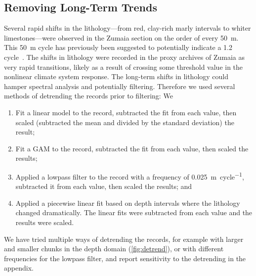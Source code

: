 \documentclass[draft]{agujournal2019}
\newcommand{\rez}{\textcolor{magenta}}
\newcommand{\ijk}{\textcolor{blue}}
\begin{document}
\subsection{Removing Long-Term Trends}\label{sec:detrend}

Several rapid shifts in the lithology---from red, clay-rich marly intervals to whiter limestones---were observed in the Zumaia section on the order of every \qty{50}{\metre}.
This \qty{50}{\metre} cycle has previously been suggested to potentially indicate a \qty{1.2}{\millionyear} cycle~\cite{Batenburg2014}.
The shifts in lithology were recorded in the proxy archives of Zumaia as very rapid transitions, likely as a result of crossing some threshold value in the nonlinear climate system response.
The long-term shifts in lithology could hamper spectral analysis and potentially filtering.
Therefore we used several methods of detrending the records prior to filtering: We
\begin{enumerate}
    \item Fit a linear model to the record, subtracted the fit from each value, then scaled (subtracted the mean and divided by the standard deviation) the result;
    \item Fit a \gls{GAM} to the record, subtracted the fit from each value, then scaled the results;
    \item Applied a lowpass filter to the record with a frequency of \qty{0.025}{\metre\per cycle}, subtracted it from each value, then scaled the results;
and
    \item Applied a piecewise linear fit based on depth intervals where the lithology changed dramatically.
    The linear fits were subtracted from each value and the results were scaled.
\end{enumerate}

We have tried multiple ways of detrending the records, for example with larger and smaller chunks in the depth domain (\cref{fig:detrend}), or with different frequencies for the lowpass filter, and report sensitivity to the detrending in the appendix.

\end{document}

